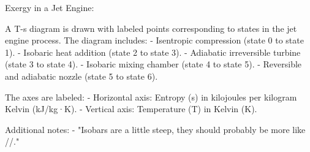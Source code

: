 Exergy in a Jet Engine:  

A T-s diagram is drawn with labeled points corresponding to states in the jet engine process. The diagram includes:  
- Isentropic compression (state 0 to state 1).  
- Isobaric heat addition (state 2 to state 3).  
- Adiabatic irreversible turbine (state 3 to state 4).  
- Isobaric mixing chamber (state 4 to state 5).  
- Reversible and adiabatic nozzle (state 5 to state 6).  

The axes are labeled:  
- Horizontal axis: Entropy (s) in kilojoules per kilogram Kelvin (kJ/kg·K).  
- Vertical axis: Temperature (T) in Kelvin (K).  

Additional notes:  
- "Isobars are a little steep, they should probably be more like //."